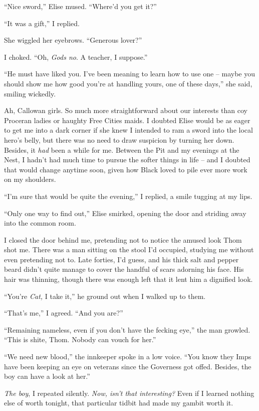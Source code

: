 \documentclass[12pt, openany]{book}
\begin{document}
“Nice sword,” Elise mused. “Where’d you get it?”

“It was a gift,” I replied.

She wiggled her eyebrows. “Generous lover?”

I choked. “Oh, \textit{Gods no}. A teacher, I suppose.”

“He must have liked you. I’ve been meaning to learn how to use one – maybe you should show me how good you’re at handling yours, one of these days,” she said, smiling wickedly.

Ah, Callowan girls. So much more straightforward about our interests than coy Proceran ladies or haughty Free Cities maids. I doubted Elise would be as eager to get me into a dark corner if she knew I intended to ram a sword into the local hero’s belly, but there was no need to draw suspicion by turning her down. Besides, it \textit{had} been a while for me. Between the Pit and my evenings at the Nest, I hadn’t had much time to pursue the softer things in life – and I doubted that would change anytime soon, given how Black loved to pile ever more work on my shoulders.

“I’m sure that would be quite the evening,” I replied, a smile tugging at my lips.

“Only one way to find out,” Elise smirked, opening the door and striding away into the common room.

I closed the door behind me, pretending not to notice the amused look Thom shot me. There was a man sitting on the stool I’d occupied, studying me without even pretending not to. Late forties, I’d guess, and his thick salt and pepper beard didn’t quite manage to cover the handful of scars adorning his face. His hair was thinning, though there was enough left that it lent him a dignified look.

“You’re \textit{Cat,} I take it,” he ground out when I walked up to them.

“That’s me,” I agreed. “And you are?”

“Remaining nameless, even if you don’t have the fecking eye,” the man growled. “This is shite, Thom. Nobody can vouch for her.”

“We need new blood,” the innkeeper spoke in a low voice. “You know they Imps have been keeping an eye on veterans since the Governess got offed. Besides, the boy can have a look at her.”

\textit{The boy}, I repeated silently. \textit{Now, isn’t that interesting? }Even if I learned nothing else of worth tonight, that particular tidbit had made my gambit worth it.
\end{document}
